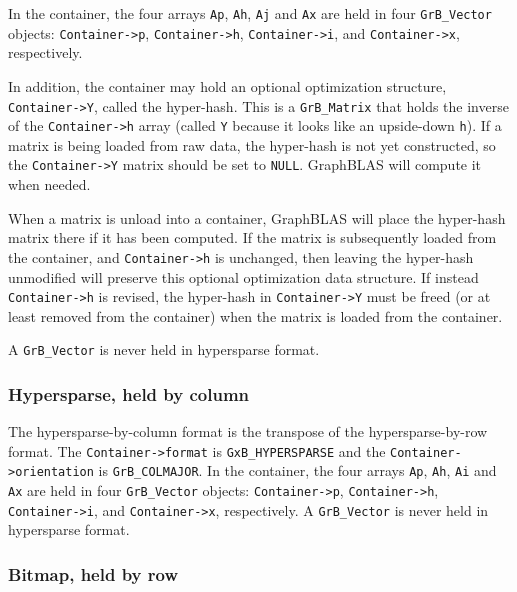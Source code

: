 In the container, the four arrays \verb'Ap', \verb'Ah', \verb'Aj' and \verb'Ax'
are held in four \verb'GrB_Vector' objects:
\verb'Container->p',
\verb'Container->h',
\verb'Container->i', and \newline
\verb'Container->x', respectively.

In addition, the container may hold an optional optimization structure,
\verb'Container->Y', called the hyper-hash.  This is a \verb'GrB_Matrix' that
holds the inverse of the \verb'Container->h' array (called \verb'Y' because it
looks like an upside-down \verb'h').  If a matrix is being loaded from raw
data, the hyper-hash is not yet constructed, so the \verb'Container->Y' matrix
should be set to \verb'NULL'.  GraphBLAS will compute it when needed.

When a matrix is unload into a container, GraphBLAS will place the hyper-hash
matrix there if it has been computed.  If the matrix is subsequently loaded
from the container, and \verb'Container->h' is unchanged, then leaving the
hyper-hash unmodified will preserve this optional optimization data structure.
If instead \verb'Container->h' is revised, the hyper-hash in
\verb'Container->Y' must be freed (or at least removed from the container) when
the matrix is loaded from the container.

A \verb'GrB_Vector' is never held in hypersparse format.

\subsubsection{Hypersparse, held by column}
\label{format_hypersparse_by_col}

The hypersparse-by-column format is the transpose of the hypersparse-by-row format.
The \verb'Container->format' is \verb'GxB_HYPERSPARSE' and the \newline
\verb'Container->orientation' is \verb'GrB_COLMAJOR'.
In the container, the four arrays \verb'Ap', \verb'Ah', \verb'Ai' and \verb'Ax'
are held in four \verb'GrB_Vector' objects:
\verb'Container->p',
\verb'Container->h',
\verb'Container->i', and
\verb'Container->x', respectively.
A \verb'GrB_Vector' is never held in hypersparse format.

\subsubsection{Bitmap, held by row}
\label{format_bitmap_by_row}

